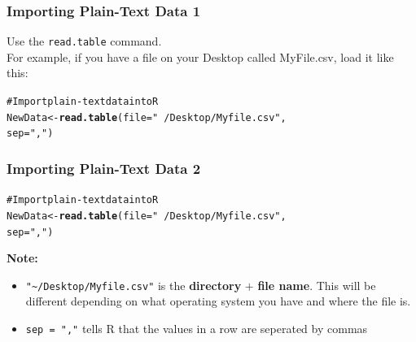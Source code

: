 \documentclass{beamer}\usepackage{graphicx, color}
\makeatletter
\newcommand{\hlfunctioncall}[1]{\textcolor[rgb]{0.501960784313725,0,0.329411764705882}{\textbf{#1}}}%
\newcommand{\hlstring}[1]{\textcolor[rgb]{0.6,0.6,1}{#1}}%
\newcommand{\hlcomment}[1]{\textcolor[rgb]{0.180392156862745,0.6,0.341176470588235}{#1}}%
\newenvironment{kframe}{%
 \def\at@end@of@kframe{}%
 \ifinner\ifhmode%
  \def\at@end@of@kframe{\end{minipage}}%
  \begin{minipage}{\columnwidth}%
 \fi\fi%
 \def\FrameCommand##1{\hskip\@totalleftmargin \hskip-\fboxsep
 \colorbox{shadecolor}{##1}\hskip-\fboxsep
     \hskip-\linewidth \hskip-\@totalleftmargin \hskip\columnwidth}%
 \MakeFramed {\advance\hsize-\width
   \@totalleftmargin\z@ \linewidth\hsize
   \@setminipage}}%
 {\par\unskip\endMakeFramed%
 \at@end@of@kframe}
\newenvironment{knitrout}{}{} %
\makeatother
\begin{document}

\begin{frame}[fragile]
  \frametitle{Importing Plain-Text Data 1}
  Use the \texttt{read.table} command. \\[0.5cm]
  For example, if you have a file on your Desktop called MyFile.csv, load it like this:
\begin{knitrout}
\color{fgcolor}\begin{kframe}
\begin{alltt}
\hlcomment{# Import plain-text data into R}
NewData <- \hlfunctioncall{read.table}(file = \hlstring{"~/Desktop/Myfile.csv"}, 
    sep = \hlstring{","})
\end{alltt}
\end{kframe}
\end{knitrout}

\end{frame}

\begin{frame}[fragile]
  \frametitle{Importing Plain-Text Data 2}
\begin{knitrout}
\color{fgcolor}\begin{kframe}
\begin{alltt}
\hlcomment{# Import plain-text data into R}
NewData <- \hlfunctioncall{read.table}(file = \hlstring{"~/Desktop/Myfile.csv"}, 
    sep = \hlstring{","})
\end{alltt}
\end{kframe}
\end{knitrout}


  {\bf{Note:}}
  \begin{itemize}
    \item<1-> \texttt{"\textasciitilde{}/Desktop/Myfile.csv"} is the {\bf{directory}} $+$ {\bf{file name}}. This will be different depending on what operating system you have and where the file is.
    \item<2-> \texttt{sep = ","} tells R that the values in a row are seperated by commas
  \end{itemize}
\end{frame}

\end{document}
